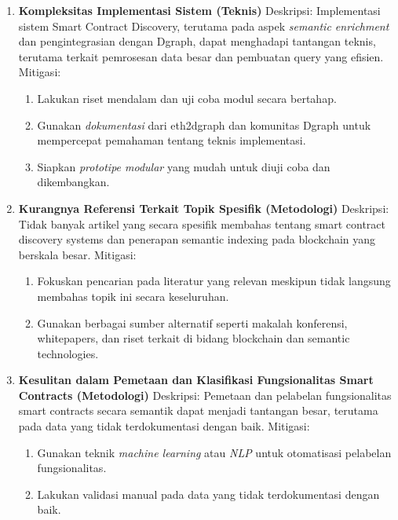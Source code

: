 \begin{enumerate}
  \item \textbf{Kompleksitas Implementasi Sistem (Teknis)} \newline 
  Deskripsi: Implementasi sistem Smart Contract Discovery, terutama pada aspek \textit{semantic enrichment} dan pengintegrasian dengan Dgraph, dapat menghadapi tantangan teknis, terutama terkait pemrosesan data besar dan pembuatan query yang efisien. \newline
  Mitigasi:
  \begin{enumerate}
    \item Lakukan riset mendalam dan uji coba modul secara bertahap.  
    \item Gunakan \textit{dokumentasi} dari eth2dgraph dan komunitas Dgraph untuk mempercepat pemahaman tentang teknis implementasi. 
    \item Siapkan \textit{prototipe modular} yang mudah untuk diuji coba dan dikembangkan.
  \end{enumerate}
  \item \textbf{Kurangnya Referensi Terkait Topik Spesifik (Metodologi)} \newline 
  Deskripsi: Tidak banyak artikel yang secara spesifik membahas tentang smart contract discovery systems dan penerapan semantic indexing pada blockchain yang berskala besar.  \newline
  Mitigasi:  
  \begin{enumerate}
    \item Fokuskan pencarian pada literatur yang relevan meskipun tidak langsung membahas topik ini secara keseluruhan.
    \item Gunakan berbagai sumber alternatif seperti makalah konferensi, whitepapers, dan riset terkait di bidang blockchain dan semantic technologies.  
  \end{enumerate}
  \item \textbf{Kesulitan dalam Pemetaan dan Klasifikasi Fungsionalitas Smart Contracts (Metodologi)}  \newline
  Deskripsi: Pemetaan dan pelabelan fungsionalitas smart contracts secara semantik dapat menjadi tantangan besar, terutama pada data yang tidak terdokumentasi dengan baik. \newline  
  Mitigasi:  
  \begin{enumerate}
    \item Gunakan teknik \textit{machine learning} atau \textit{NLP} untuk otomatisasi pelabelan fungsionalitas.  
    \item Lakukan validasi manual pada data yang tidak terdokumentasi dengan baik.

\end{enumerate}
\end{enumerate}
